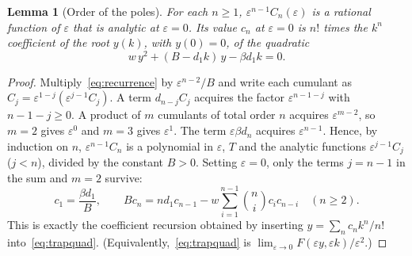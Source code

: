 \documentclass[11pt,a4paper]{article}
\newtheorem{lemma}[theorem]{Lemma}
\theoremstyle{remark}\newtheorem{remark}[theorem]{Remark}
\newcommand{\eps}{\varepsilon}
\begin{document}
\begin{lemma}[Order of the poles]\label{lem:poles}
For each $n\ge1$, $\eps^{n-1}C_n(\eps)$ is a rational function of $\eps$ that is analytic at $\eps=0$. Its value $c_n$ at $\eps=0$ is $n!$ times the $k^n$ coefficient of the root $y(k)$, with $y(0)=0$, of the quadratic
\begin{equation}\label{eq:trapquad}
w\,y^2+(B-d_1k)\,y-\beta d_1k=0.
\end{equation}
\end{lemma}
\begin{proof}
Multiply~\eqref{eq:recurrence} by $\eps^{n-2}/B$ and write each cumulant as $C_j=\eps^{1-j}(\eps^{j-1}C_j)$. A term $d_{n-j}C_j$ acquires the factor $\eps^{n-1-j}$ with $n-1-j\ge0$. A product of $m$ cumulants of total order $n$ acquires $\eps^{m-2}$, so $m=2$ gives $\eps^0$ and $m=3$ gives $\eps^1$. The term $\eps\beta d_n$ acquires $\eps^{n-1}$. Hence, by induction on $n$, $\eps^{n-1}C_n$ is a polynomial in $\eps$, $T$ and the analytic functions $\eps^{j-1}C_j$ ($j<n$), divided by the constant $B>0$. Setting $\eps=0$, only the terms $j=n-1$ in the sum and $m=2$ survive:
\begin{equation}
c_1=\frac{\beta d_1}{B},\qquad Bc_n=nd_1c_{n-1}-w\sum_{i=1}^{n-1}\binom ni c_ic_{n-i}\quad(n\ge2).
\end{equation}
This is exactly the coefficient recursion obtained by inserting $y=\sum_n c_nk^n/n!$ into~\eqref{eq:trapquad}. (Equivalently,~\eqref{eq:trapquad} is $\lim_{\eps\to0}F(\eps y,\eps k)/\eps^2$.)
\end{proof}
\end{document}
